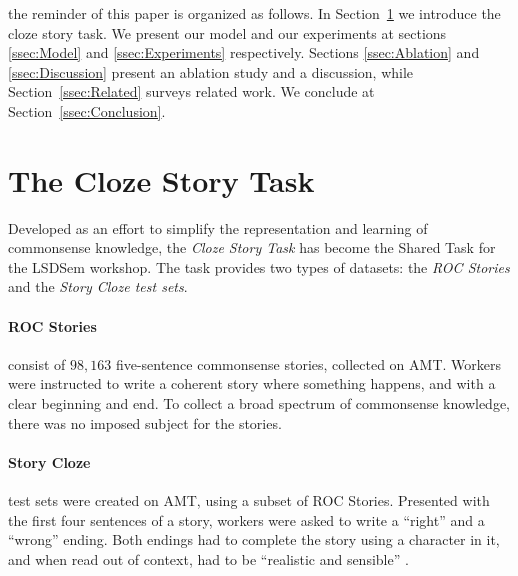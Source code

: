 \documentclass[11pt,a4paper]{article}
\newcommand{\secref}[1]{Section~\ref{ssec:#1}}
\newcommand{\isection}[2]{\section{#1}\label{ssec:#2}}
\newcommand{\roy}[1]{\footnote{\color{red}{\textbf{Roy: #1}}}}
\newcommand{\royb}[2]{{\color{red}{\sout{#1}}}{\color{green}{#2}}}
\renewcommand{\roy}[1]{}
\renewcommand{\royb}[1]{}
\begin{document}
the reminder of this paper is organized as follows. In \secref{ROC_Story} we introduce the cloze story task.
We present our model and our experiments at sections \ref{ssec:Model} and \ref{ssec:Experiments} respectively.
Sections \ref{ssec:Ablation} and \ref{ssec:Discussion} present an ablation study and a discussion, while \secref{Related}  surveys related work. 
We conclude at \secref{Conclusion}.

\isection{The Cloze Story Task}{ROC_Story}\roy{We should start with a general paragraph reminding the reader of the problem and why we are using this corpus.}
Developed as an effort to simplify\roy{``simplify'' is not the right term here. {\it Facilitate} maybe? }  the representation and learning of commonsense knowledge, the \textit{Cloze Story Task} \cite{Mostafazadeh:2016} has become the Shared Task for the LSDSem workshop.\roy{Not sure that this sentence is so terrible, but I would not put the focus on the shared task. This is a rather minor detail and has very little relevance to our story. Think about what we want to reader who has very little time or energy to know. 
Specifically, I would start with few very general details and motivation (as you did), but then directly move to mention the interesting design decisions they took, 
which actually raise  very different type of research questions, which we tackle in this paper. Then you can move to describe it more formally, as you do below (you can mention the shared task there if you want, not sure it's even necessary).} %
The task provides two types of datasets: the \textit{ROC Stories} and the \textit{Story Cloze test sets}.

\paragraph{ROC Stories}
consist of $98,163$ five-sentence commonsense stories, collected on AMT\roy{I would use ``Amazon Mechanical Turk (AMT)'' here, and AMT from now on}. Workers were instructed to write a coherent story where something happens, and with a clear beginning and end. To collect a broad spectrum of commonsense knowledge, there was no imposed subject for the stories.
\paragraph{Story Cloze} test sets were created on AMT, using a subset of ROC Stories. Presented with the first four sentences of a story, workers were asked to write a ``right'' and a ``wrong'' ending. \royb{The ending}{Both endings} had to complete the story using a character in it, and when read out of context, had to be ``realistic and sensible'' \cite{Mostafazadeh:2016}.
\end{document}
